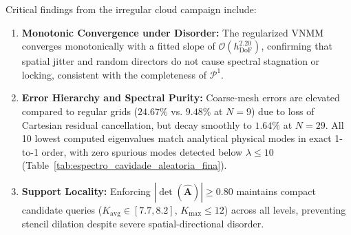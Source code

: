 \documentclass[preprint,12pt]{elsarticle}
\begin{document}
Critical findings from the irregular cloud campaign include:
\begin{enumerate}
    \item \textbf{Monotonic Convergence under Disorder:} The regularized VNMM converges monotonically with a fitted slope of $\mathcal{O}(h_{\mathrm{DoF}}^{2.20})$, confirming that spatial jitter and random directors do not cause spectral stagnation or locking, consistent with the completeness of $\mathcal{P}^1$.
    \item \textbf{Error Hierarchy and Spectral Purity:} Coarse-mesh errors are elevated compared to regular grids ($24.67\%$ vs. $9.48\%$ at $N=9$) due to loss of Cartesian residual cancellation, but decay smoothly to $1.64\%$ at $N=29$. All 10 lowest computed eigenvalues match analytical physical modes in exact 1-to-1 order, with zero spurious modes detected below $\lambda \le 10$ (Table~\ref{tab:espectro_cavidade_aleatoria_fina}).
    \item \textbf{Support Locality:} Enforcing $|\det(\widehat{\mathbf{A}})| \ge 0.80$ maintains compact candidate queries ($K_{\mathrm{avg}} \in [7.7, 8.2]$, $K_{\max} \le 12$) across all levels, preventing stencil dilation despite severe spatial-directional disorder.
\end{enumerate}
\end{document}
